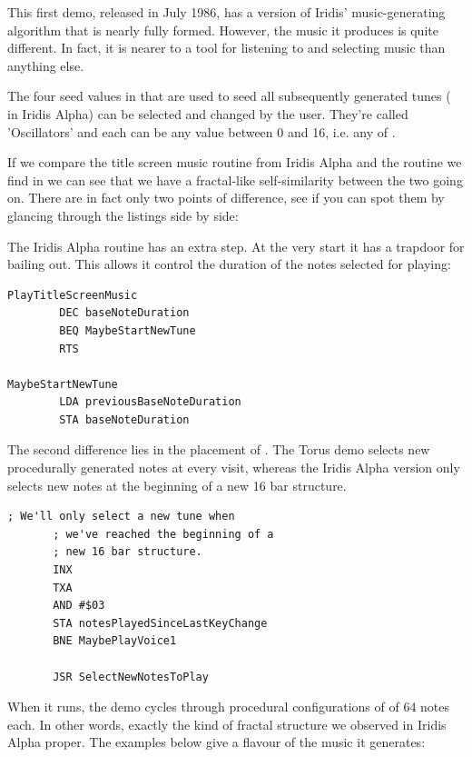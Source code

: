 This first demo, released in July 1986, has a version of Iridis' music-generating
algorithm that is nearly fully formed. However, the music it produces is quite
different. In fact, it is nearer to a tool for listening to and selecting music than
anything else.

The four seed values in  that are used to seed all subsequently
generated tunes ( in Iridis Alpha) can be selected and changed by the
user. They're called 'Oscillators' and each can be any value between 0 and 16, i.e. any of
.

If we compare the title screen music routine from Iridis Alpha and the routine we find in  we can see that we
have a fractal-like self-similarity between the two going on. There are in fact only two points of difference, see if you can
spot them by glancing through the listings side by side:
\lstset{style=6502Style}


The Iridis Alpha routine has an extra step. At the very start it has a trapdoor for bailing out. This allows it control the duration
of the notes selected for playing:

\begin{lstlisting}[]
PlayTitleScreenMusic
        DEC baseNoteDuration
        BEQ MaybeStartNewTune
        RTS

MaybeStartNewTune   
        LDA previousBaseNoteDuration
        STA baseNoteDuration
\end{lstlisting}

The second difference lies in the placement of . The Torus demo selects new procedurally generated notes at every visit,
whereas the Iridis Alpha version only selects new notes at the beginning of a new 16 bar structure.
\begin{lstlisting}[]
       ; We'll only select a new tune when
       ; we've reached the beginning of a
       ; new 16 bar structure.            
       INX
       TXA
       AND #$03
       STA notesPlayedSinceLastKeyChange
       BNE MaybePlayVoice1

       JSR SelectNewNotesToPlay
\end{lstlisting}

When it runs, the demo cycles through procedural configurations of  of 64 notes each.
In other words, exactly the kind of fractal structure we observed in Iridis Alpha proper. The examples below
give a flavour of the music it generates:

